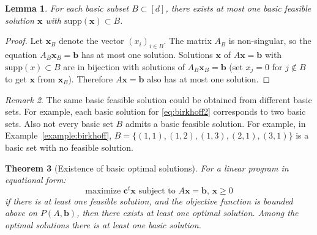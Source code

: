 \documentclass{amsbook}
\newcommand{\xx}{\mathbf x}
\newcommand{\cc}{\mathbf c}
\newcommand{\bb}{\mathbf b}
\newcommand{\supp}{\mathrm{supp}}
\newtheorem{theorem}{Theorem}[section]
\newtheorem{lemma}[theorem]{Lemma}
\theoremstyle{definition}
\theoremstyle{remark}
\newtheorem{remark}[theorem]{Remark}
\begin{document}
\begin{lemma}
  \label{lemma:unique-for-B}
  For each basic subset $B\subset [d]$, there exists at most one basic feasible solution $\xx$ with $\supp(\xx)\subset B$.
\end{lemma}
\begin{proof}
  Let $\xx_B$ denote the vector $(x_i)_{i\in B}$.
  The matrix $A_B$ is non-singular, so the equation $A_B\xx_B=\bb$ has at most one solution.
  Solutions $\xx$ of $A\xx=\bb$ with $\supp(x)\subset B$ are in bijection with solutions of $A_B\xx_B=\bb$ (set $x_j=0$ for $j\notin B$ to get $\xx$ from $\xx_B$).
  Therefore $A\xx=\bb$ also has at most one solution.
\end{proof}
\begin{remark}
  The same basic feasible solution could be obtained from different basic sets.
  For example, each basic solution for \eqref{eq:birkhoff2} corresponds to two basic sets.
  Also not every basic set $B$ admits a basic feasible solution.
  For example, in Example~\ref{example:birkhoff}, $B=\{(1,1),(1,2),(1,3),(2,1),(3,1)\}$ is a basic set with no feasible solution.
\end{remark}
\begin{theorem}
  [Existence of basic optimal solutions]
  \label{theorem:existence-of-basic-solutions}
  For a linear program in equational form:
  \begin{displaymath}
    \text{maximize $\cc^t\xx$ subject to $A\xx=\bb$, $\xx\geq 0$}
  \end{displaymath}
  if there is at least one feasible solution, and the objective function is bounded above on $P(A,\bb)$, then there exists at least one optimal solution.
  Among the optimal solutions there is at least one basic solution.
\end{theorem}
\end{document}
